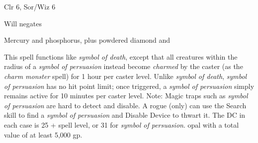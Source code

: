 
\begin{description*}
\item[Level:] Clr 6, Sor/Wiz 6
\item[Saving Throw:] Will negates
\item[Arcane Material Component:] Mercury and phosphorus, plus powdered diamond and
\end{description*}

This spell functions like \textit{symbol of death}, except that all creatures within
the radius of a \textit{symbol of persuasion} instead become \textit{charmed} by
the caster (as the \textit{charm monster} spell) for 1 hour per caster level.
Unlike \textit{symbol of death}, \textit{symbol of persuasion} has no hit point
limit; once triggered, a \textit{symbol of persuasion} simply remains active for
10 minutes per caster level.
Note: Magic traps such as \textit{symbol of persuasion} are hard to detect
and disable. A rogue (only) can use the Search skill to find a \textit{symbol of
persuasion} and Disable Device to thwart it. The DC in each case is 25 + spell
level, or 31 for \textit{symbol of persuasion}.
opal with a total value of at least 5,000 gp.
